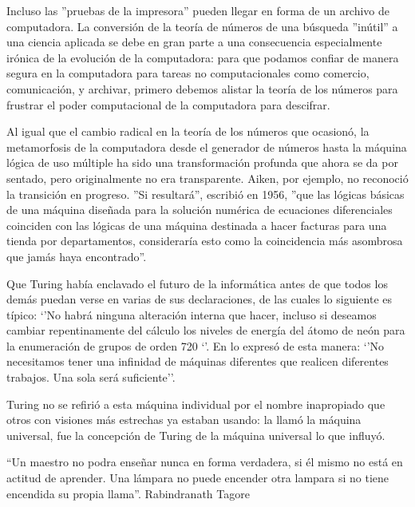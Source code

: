 \documentclass[12pt]{article}
\begin{document}
\vspace{15PT}
Incluso las ''pruebas de la impresora'' pueden llegar en forma de un archivo de computadora. La conversión de la teoría de números de una búsqueda ''inútil'' a una ciencia aplicada se debe en gran parte a una consecuencia especialmente irónica de la evolución de la computadora: para que podamos confiar de manera segura en la computadora para tareas no computacionales como comercio, comunicación, y archivar, primero debemos alistar la teoría de los números para frustrar el poder computacional de la computadora para descifrar. 

\vspace{15PT}
Al igual que el cambio radical en la teoría de los números que ocasionó, la metamorfosis de la computadora desde el generador de números hasta la máquina lógica de uso múltiple ha sido una transformación profunda que ahora se da por sentado, pero originalmente no era transparente. Aiken, por ejemplo, no reconoció la transición en progreso. ''Si resultará'', escribió en 1956, ''que las lógicas básicas de una máquina diseñada para la solución numérica de ecuaciones diferenciales coinciden con las lógicas de una máquina destinada a hacer facturas para una tienda por departamentos, consideraría esto como la coincidencia más asombrosa que jamás haya encontrado''.


\vspace{15PT}
Que Turing había enclavado el futuro de la informática antes de que todos los demás puedan verse en varias de sus declaraciones, de las cuales lo siguiente es típico: ‘’No habrá ninguna alteración interna que hacer, incluso si deseamos cambiar repentinamente del cálculo los niveles de energía del átomo de neón para la enumeración de grupos de orden 720 ‘’. En lo expresó de esta manera: ‘’No necesitamos tener una infinidad de máquinas diferentes que realicen diferentes trabajos. Una sola será suficiente’’.

\vspace{15PT}
 Turing no se refirió a esta máquina individual por el nombre inapropiado que otros con visiones más estrechas ya estaban usando: la llamó la máquina universal, fue la concepción de Turing de la máquina universal lo que influyó. 

\vspace{15PT}
“Un maestro no podra enseñar nunca en forma verdadera, si él mismo no está en actitud de aprender. Una lámpara no puede encender otra lampara si no tiene encendida su propia llama”. Rabindranath Tagore
\end{document}
